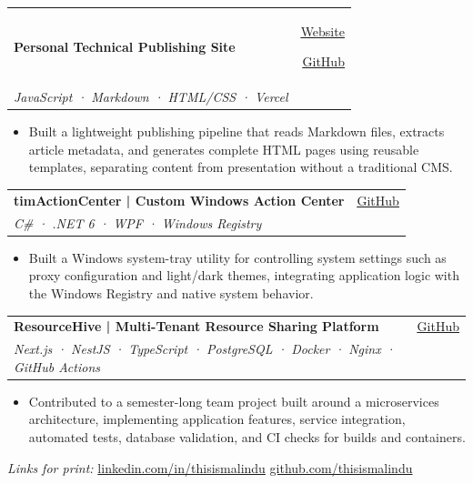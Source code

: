 \documentclass[10pt,a4paper]{article}
\makeatletter
\newcommand{\cvlink}[2]{\href{#1}{\uline{#2}}}
\newcommand{\linksep}{
    \hspace{0.35em}{\small\textbullet}\hspace{0.35em}
}
\newcommand{\project}[3]{
\begin{tabularx}{\textwidth}{@{}Xr@{}}
    \textbf{#1} & {\small #3} \\[-0.5pt]
    {\small\textit{#2}} & {}
\end{tabularx}
\vspace{-1pt}
}
\makeatother
\begin{document}
\vspace{1pt}


\project
{Personal Technical Publishing Site}
{JavaScript · Markdown · HTML/CSS · Vercel}
{
\cvlink{https://thisismalindu.com}{Website}
\linksep
\cvlink{https://github.com/thisismalindu/my-website-blog}{GitHub}
}

\begin{itemize}
\item Built a lightweight publishing pipeline that reads Markdown files,
extracts article metadata, and generates complete HTML pages using reusable
templates, separating content from presentation without a traditional CMS.
\end{itemize}

\vspace{1pt}


\project
{timActionCenter | Custom Windows Action Center}
{C\# · .NET 6 · WPF · Windows Registry}
{\cvlink{https://github.com/thisismalindu/timActionCenter}{GitHub}}

\begin{itemize}
\item Built a Windows system-tray utility for controlling system settings such
as proxy configuration and light/dark themes, integrating application logic
with the Windows Registry and native system behavior.
\end{itemize}

\vspace{1pt}


\project
{ResourceHive | Multi-Tenant Resource Sharing Platform}
{Next.js · NestJS · TypeScript · PostgreSQL · Docker · Nginx · GitHub Actions}
{\cvlink{https://github.com/resourcehive-team/resourcehive}{GitHub}}

\begin{itemize}
\item Contributed to a semester-long team project built around a microservices
architecture, implementing application features, service integration,
automated tests, database validation, and CI checks for builds and containers.
\end{itemize}


\vfill

\begin{center}
\scriptsize
\textit{Links for print:}
\href{https://www.linkedin.com/in/thisismalindu/}
{linkedin.com/in/thisismalindu}
\hspace{0.7em}\textbullet\hspace{0.7em}
\href{https://github.com/thisismalindu}
{github.com/thisismalindu}
\end{center}
\end{document}
